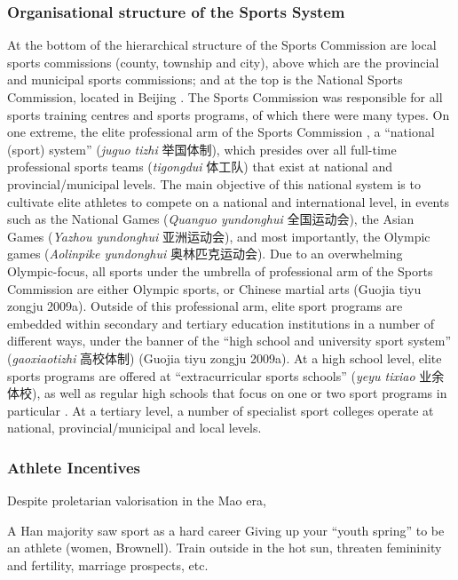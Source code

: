 \begin{CJK}{UTF8}{gbsn}
\subsubsection{Organisational structure of the Sports System}
At the bottom of the hierarchical structure of the Sports Commission are local sports commissions (county, township and city), above which are the provincial and municipal sports commissions; and at the top is the National Sports Commission, located in Beijing \citep[59]{Brownell1995}.  The Sports Commission was responsible for all sports training centres and sports programs, of which there were many types.  On one extreme, the elite professional arm of the Sports Commission , a ``national (sport) system'' (\textit{juguo tizhi} 举国体制), which presides over all full-time professional sports teams (\textit{tigongdui} 体工队) that exist at national and provincial/municipal levels.  The main objective of this national system is to cultivate elite athletes to compete on a national and international level, in events such as the National Games (\textit{Quanguo yundonghui} 全国运动会), the Asian Games (\textit{Yazhou yundonghui} 亚洲运动会), and most importantly, the Olympic games (\textit{Aolinpike yundonghui} 奥林匹克运动会).  Due to an overwhelming Olympic-focus, all sports under the umbrella of professional arm of the Sports Commission are either Olympic sports, or Chinese martial arts (Guojia tiyu zongju 2009a).  Outside of this professional arm, elite sport programs are embedded within secondary and tertiary education institutions in a number of different ways, under the banner of the ``high school and university sport system'' (\textit{gaoxiaotizhi} 高校体制) (Guojia tiyu zongju 2009a).  At a high school level, elite sports programs are offered at ``extracurricular sports schools'' (\textit{yeyu tixiao} 业余体校), as well as regular high schools that focus on one or two sport programs in particular \citep[59]{Brownell1995}. At a tertiary level, a number of specialist sport colleges operate at national, provincial/municipal and local levels.


\subsubsection{Athlete Incentives}

Despite proletarian valorisation in the Mao era,

A Han majority saw sport as a hard career
Giving up your ``youth spring'' to be an athlete (women, Brownell).  Train outside in the hot sun, threaten femininity and fertility, marriage prospects, etc.


\end{CJK}
